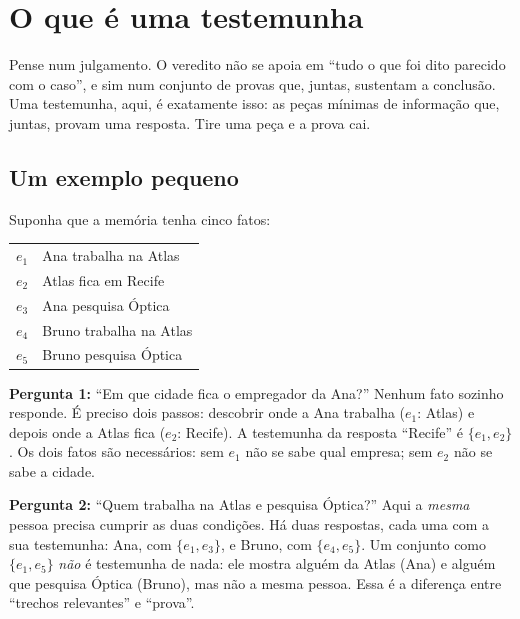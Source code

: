 \documentclass[11pt]{article}
\begin{document}
\section{O que é uma testemunha}\label{sec:testemunha}

\begin{ideia}
Pense num julgamento. O veredito não se apoia em ``tudo o que foi dito
parecido com o caso'', e sim num conjunto de provas que, juntas, sustentam a
conclusão. Uma testemunha, aqui, é exatamente isso: as peças mínimas de
informação que, juntas, provam uma resposta. Tire uma peça e a prova cai.
\end{ideia}

\subsection{Um exemplo pequeno}

Suponha que a memória tenha cinco fatos:

\begin{center}
\begin{tabular}{cl}
$e_1$ & Ana trabalha na Atlas \\
$e_2$ & Atlas fica em Recife \\
$e_3$ & Ana pesquisa Óptica \\
$e_4$ & Bruno trabalha na Atlas \\
$e_5$ & Bruno pesquisa Óptica \\
\end{tabular}
\end{center}

\textbf{Pergunta 1:} ``Em que cidade fica o empregador da Ana?'' Nenhum fato
sozinho responde. É preciso dois passos: descobrir onde a Ana trabalha
($e_1$: Atlas) e depois onde a Atlas fica ($e_2$: Recife). A testemunha da
resposta ``Recife'' é $\{e_1,e_2\}$. Os dois fatos são necessários: sem $e_1$
não se sabe qual empresa; sem $e_2$ não se sabe a cidade.

\textbf{Pergunta 2:} ``Quem trabalha na Atlas e pesquisa Óptica?'' Aqui a
\emph{mesma} pessoa precisa cumprir as duas condições. Há duas respostas, cada
uma com a sua testemunha: Ana, com $\{e_1,e_3\}$, e Bruno, com $\{e_4,e_5\}$.
Um conjunto como $\{e_1,e_5\}$ \emph{não} é testemunha de nada: ele mostra
alguém da Atlas (Ana) e alguém que pesquisa Óptica (Bruno), mas não a mesma
pessoa. Essa é a diferença entre ``trechos relevantes'' e ``prova''.
\end{document}
